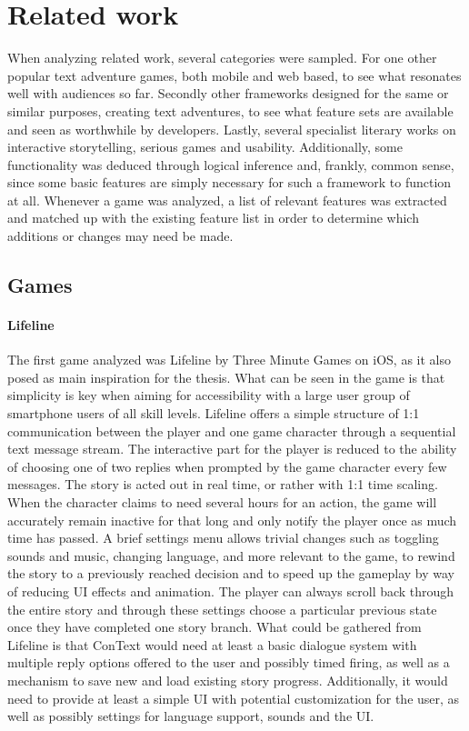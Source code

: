 \section{Related work}
When analyzing related work, several categories were sampled. For one other popular text adventure games, both mobile and web based, to see what resonates well with audiences so far. Secondly other frameworks designed for the same or similar purposes, creating text adventures, to see what feature sets are available and seen as worthwhile by developers. Lastly, several specialist literary works on interactive storytelling, serious games and usability. Additionally, some functionality was deduced through logical inference and, frankly, common sense, since some basic features are simply necessary for such a framework to function at all.
Whenever a game was analyzed, a list of relevant features was extracted and matched up with the existing feature list in order to determine which additions or changes may need be made.

\subsection{Games}
\paragraph{Lifeline} %
The first game analyzed was Lifeline by Three Minute Games on iOS, as it also posed as main inspiration for the thesis. What can be seen in the game is that simplicity is key when aiming for accessibility with a large user group of smartphone users of all skill levels. Lifeline offers a simple structure of 1:1 communication between the player and one game character through a sequential text message stream. The interactive part for the player is reduced to the ability of choosing one of two replies when prompted by the game character every few messages. 
The story is acted out in real time, or rather with 1:1 time scaling. When the character claims to need several hours for an action, the game will accurately remain inactive for that long and only notify the player once as much time has passed.
A brief settings menu allows trivial changes such as toggling sounds and music, changing language, and more relevant to the game, to rewind the story to a previously reached decision and to speed up the gameplay by way of reducing UI effects and animation. 
The player can always scroll back through the entire story and through these settings choose a particular previous state once they have completed one story branch. 
What could be gathered from Lifeline is that ConText would need at least a basic dialogue system with multiple reply options offered to the user and possibly timed firing, as well as a mechanism to save new and load existing story progress. Additionally, it would need to provide at least a simple UI with potential customization for the user, as well as possibly settings for language support, sounds and the UI.

